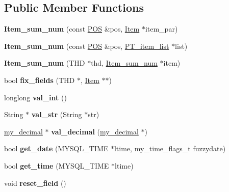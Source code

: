 \subsection*{Public Member Functions}
\begin{DoxyCompactItemize}
\item 
\mbox{\label{classItem__sum__num_a9858f45c43dac7bcbe2ecf008a8ab2d7}} 
{\bfseries Item\+\_\+sum\+\_\+num} (const \mbox{\hyperlink{structYYLTYPE}{P\+OS}} \&pos, \mbox{\hyperlink{classItem}{Item}} $\ast$item\+\_\+par)
\item 
\mbox{\label{classItem__sum__num_ad4be02be5cbf9f33234bb6b6b8a844b7}} 
{\bfseries Item\+\_\+sum\+\_\+num} (const \mbox{\hyperlink{structYYLTYPE}{P\+OS}} \&pos, \mbox{\hyperlink{classPT__item__list}{P\+T\+\_\+item\+\_\+list}} $\ast$list)
\item 
\mbox{\label{classItem__sum__num_a1733718abe75fd4f1144432e8ee1858d}} 
{\bfseries Item\+\_\+sum\+\_\+num} (T\+HD $\ast$thd, \mbox{\hyperlink{classItem__sum__num}{Item\+\_\+sum\+\_\+num}} $\ast$item)
\item 
\mbox{\label{classItem__sum__num_a243b302007e373994418abd45f733ed5}} 
bool {\bfseries fix\+\_\+fields} (T\+HD $\ast$, \mbox{\hyperlink{classItem}{Item}} $\ast$$\ast$)
\item 
\mbox{\label{classItem__sum__num_a06ce0679eaa1fc44237e04e1474a4646}} 
longlong {\bfseries val\+\_\+int} ()
\item 
\mbox{\label{classItem__sum__num_a9223696a2d63c02c786885b32e1d97e2}} 
String $\ast$ {\bfseries val\+\_\+str} (String $\ast$str)
\item 
\mbox{\label{classItem__sum__num_a8c9a4f097680619ea22336ae6e063595}} 
\mbox{\hyperlink{classmy__decimal}{my\+\_\+decimal}} $\ast$ {\bfseries val\+\_\+decimal} (\mbox{\hyperlink{classmy__decimal}{my\+\_\+decimal}} $\ast$)
\item 
\mbox{\label{classItem__sum__num_a7c640c94f36d8f9a38225daa67d5a736}} 
bool {\bfseries get\+\_\+date} (M\+Y\+S\+Q\+L\+\_\+\+T\+I\+ME $\ast$ltime, my\+\_\+time\+\_\+flags\+\_\+t fuzzydate)
\item 
\mbox{\label{classItem__sum__num_a2cbec948908ebb4b03ac15a7abb526b1}} 
bool {\bfseries get\+\_\+time} (M\+Y\+S\+Q\+L\+\_\+\+T\+I\+ME $\ast$ltime)
\item 
\mbox{\label{classItem__sum__num_a2f578c4d0a8355718d02a81edd2399e2}} 
void {\bfseries reset\+\_\+field} ()
\end{DoxyCompactItemize}
